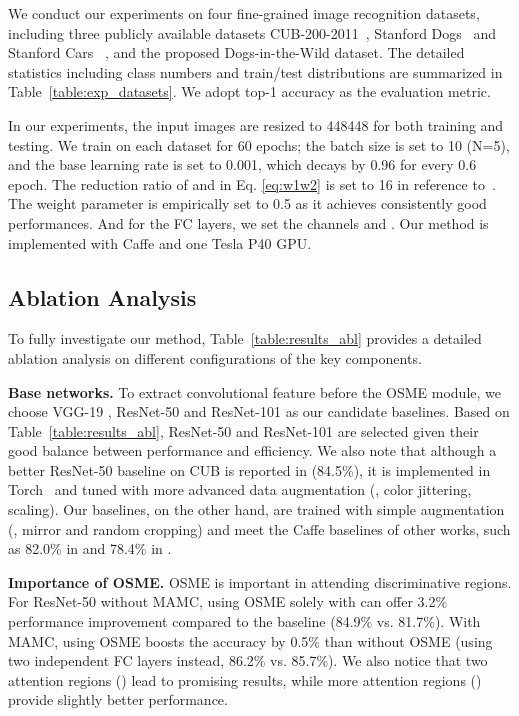 \documentclass[runningheads]{llncs}
\begin{document}
We conduct our experiments on four fine-grained image recognition datasets, including three publicly available datasets CUB-200-2011~\cite{welinder2010caltech}, Stanford Dogs~\cite{khosla2011novel} and Stanford Cars~ \cite{krause20133d}, and the proposed Dogs-in-the-Wild dataset.
The detailed statistics including class numbers and train/test distributions are summarized in Table~\ref{table:exp_datasets}.
We adopt top-1 accuracy as the evaluation metric.

In our experiments, the input images are resized to 448448 for both training and testing.
We train on each dataset for 60 epochs; the batch size is set to 10 (N=5), and the base learning rate is set to 0.001, which decays by 0.96 for every 0.6 epoch.
The reduction ratio  of  and  in Eq. \ref{eq:w1w2} is set to 16 in reference to~\cite{hu2017squeeze}.
The weight parameter  is empirically set to 0.5 as it achieves consistently good performances.
And for the FC layers, we set the channels  and .
Our method is implemented with Caffe \cite{jia2014caffe} and one Tesla P40 GPU.



\vspace{-.1in}
\subsection{Ablation Analysis}
To fully investigate our method, Table~\ref{table:results_abl} provides a detailed ablation analysis on different configurations of the key components.

\textbf{Base networks.} To extract convolutional feature before the OSME module, we choose VGG-19 \cite{simonyan2014very}, ResNet-50 and ResNet-101 \cite{he2016deep} as our candidate baselines. Based on Table~\ref{table:results_abl}, ResNet-50 and ResNet-101 are selected given their good balance between performance and efficiency.
We also note that although a better ResNet-50 baseline on CUB is reported in \cite{li2017dynamic} (84.5\%), it is implemented in Torch~\cite{collobert2011torch7} and tuned with more advanced data augmentation (\eg, color jittering, scaling).
Our baselines, on the other hand, are trained with simple augmentation (\eg, mirror and random cropping) and meet the Caffe baselines of other works, such as 82.0\% in \cite{liu2016fully} and 78.4\% in \cite{cui2017kernel}.

\textbf{Importance of OSME.} OSME is important in attending discriminative regions.
For ResNet-50 without MAMC, using OSME solely with  can offer 3.2\% performance improvement compared to the baseline (84.9\% vs. 81.7\%).
With MAMC, using OSME boosts the accuracy by 0.5\% than without OSME (using two independent FC layers instead, 86.2\% vs. 85.7\%).
We also notice that two attention regions () lead to promising results, while more attention regions () provide slightly better performance.
\end{document}
